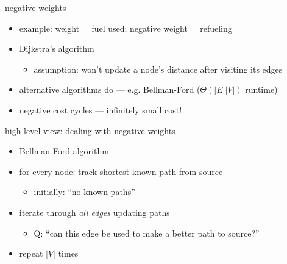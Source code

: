 \begin{frame}{negative weights}
\begin{itemize}
\item example: weight = fuel used; negative weight = refueling
\item Dijkstra's algorithm 
    \begin{itemize}
    \item assumption: won't update a node's distance after visiting its edges
    \end{itemize}
\item alternative algorithms do --- e.g. Bellman-Ford ($\Theta(|E||V|)$ runtime)
\vspace{.5cm}
\item negative cost cycles --- infinitely small cost!
\end{itemize}
\end{frame}

\begin{frame}{high-level view: dealing with negative weights}
    \begin{itemize}
    \item Bellman-Ford algorithm
        \vspace{.5cm}
    \item for every node: track shortest known path from source
        \begin{itemize}
        \item initially: ``no known paths''
        \end{itemize}
    \item iterate through \textit{all edges} updating paths
        \begin{itemize}
        \item Q: ``can this edge be used to make a better path to source?''
        \end{itemize}
    \item repeat $|V|$ times
    \end{itemize}
\end{frame}

